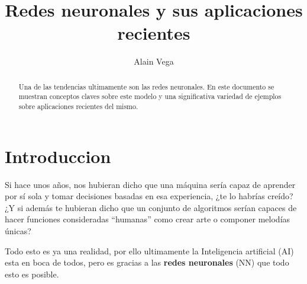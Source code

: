 \documentclass[runningheads]{llncs} %
\begin{document}
\title{Redes neuronales y sus aplicaciones recientes}

\author{Alain Vega \\ }



\maketitle           

\begin{abstract}
Una de las tendencias ultimamente son las redes neuronales. En este documento
se muestran conceptos claves sobre este modelo y una significativa variedad
de ejemplos sobre aplicaciones recientes del mismo.

\end{abstract}
\section{Introduccion}
Si hace unos años, nos hubieran dicho que una máquina sería capaz de aprender 
por sí sola y tomar decisiones basadas en esa experiencia, ¿te lo habrías creído? 
¿Y si además te hubieran dicho que un conjunto de algoritmos serían capaces de
hacer funciones consideradas \textquotedblleft{humanas}\textquotedblright{}
como crear arte o componer melodías únicas? \cite{int1}

Todo esto es ya una realidad, por ello ultimamente la Inteligencia artificial (AI) 
esta en boca de todos, pero es gracias a las \textbf{redes neuronales} (NN)
que todo esto es posible. 
\end{document}
